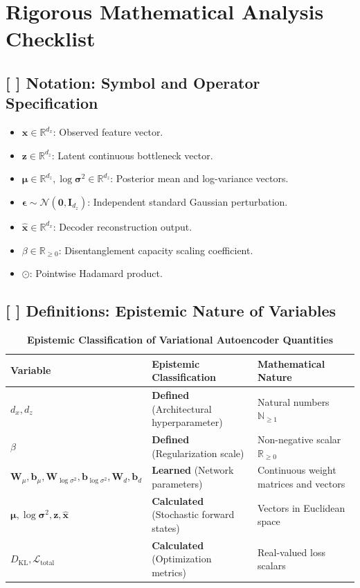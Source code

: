 \documentclass[11pt,a4paper]{article}
\theoremstyle{definition}
\begin{document}
\section{Rigorous Mathematical Analysis Checklist}

\subsection{[ ] Notation: Symbol and Operator Specification}
\begin{itemize}
    \item $\mathbf{x} \in \mathbb{R}^{d_x}$: Observed feature vector.
    \item $\mathbf{z} \in \mathbb{R}^{d_z}$: Latent continuous bottleneck vector.
    \item $\boldsymbol{\mu} \in \mathbb{R}^{d_z}, \log \boldsymbol{\sigma}^2 \in \mathbb{R}^{d_z}$: Posterior mean and log-variance vectors.
    \item $\boldsymbol{\epsilon} \sim \mathcal{N}(\mathbf{0}, \mathbf{I}_{d_z})$: Independent standard Gaussian perturbation.
    \item $\hat{\mathbf{x}} \in \mathbb{R}^{d_x}$: Decoder reconstruction output.
    \item $\beta \in \mathbb{R}_{\ge 0}$: Disentanglement capacity scaling coefficient.
    \item $\odot$: Pointwise Hadamard product.
\end{itemize}

\subsection{[ ] Definitions: Epistemic Nature of Variables}
\begin{table}[h]
\centering
\caption{\textbf{Epistemic Classification of Variational Autoencoder Quantities}}
\begin{tabular}{lll}
\toprule
\textbf{Variable} & \textbf{Epistemic Classification} & \textbf{Mathematical Nature} \\
\midrule
$d_x, d_z$ & \textbf{Defined} (Architectural hyperparameter) & Natural numbers $\mathbb{N}_{\ge 1}$ \\
$\beta$ & \textbf{Defined} (Regularization scale) & Non-negative scalar $\mathbb{R}_{\ge 0}$ \\
$\mathbf{W}_\mu, \mathbf{b}_\mu, \mathbf{W}_{\log \sigma^2}, \mathbf{b}_{\log \sigma^2}, \mathbf{W}_d, \mathbf{b}_d$ & \textbf{Learned} (Network parameters) & Continuous weight matrices and vectors \\
$\boldsymbol{\mu}, \log \boldsymbol{\sigma}^2, \mathbf{z}, \hat{\mathbf{x}}$ & \textbf{Calculated} (Stochastic forward states) & Vectors in Euclidean space \\
$D_{\text{KL}}, \mathcal{L}_{\text{total}}$ & \textbf{Calculated} (Optimization metrics) & Real-valued loss scalars \\
\bottomrule
\end{tabular}
\end{table}
\end{document}
